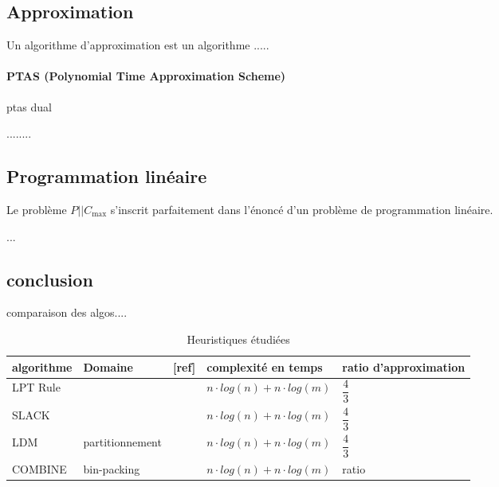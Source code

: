\documentclass[a4paper,12pt]{report}
\theoremstyle{plain}				%
\theoremstyle{definition}				%
\newcommand\problemGrahamP{$P||C_{\max}$\xspace}
\begin{document}
\subsection{Approximation}\label{ssec:Approximation}

Un algorithme d'approximation est un algorithme .....

\paragraph{PTAS (Polynomial Time Approximation Scheme)}
ptas dual 

........

\subsection{Programmation linéaire}\label{ssec:programmationLineaire}

Le problème \problemGrahamP s'inscrit parfaitement dans l'énoncé d'un problème de programmation linéaire.

...

\subsection{conclusion}\label{ssec:etatDeLArtConclusion}

comparaison des algos....

\begin{table}[h] %
\centering
\begin{tabular}{p{3cm} p{3cm} p{1cm} p{4cm} p{4cm}}
\hline
algorithme 	& Domaine 
			& [ref] 
			& complexité en temps 
			& ratio d'approximation\\
\hline

LPT Rule 	&  
			& \cite{graham1966bounds} 
			& $n \cdot log(n) + n \cdot log(m)$ 
			& $\dfrac{4}{3}$ \\

SLACK   	& 
			& \cite{della2020longest} 
			&$n \cdot log(n) + n \cdot log(m)$ 
			& $\dfrac{4}{3}$ \\

LDM   		&  partitionnement 
			& \cite{karmarkar1982differencing} 
			& $n \cdot log(n) + n \cdot log(m)$ 
			& $\dfrac{4}{3}$ \\

COMBINE 	& bin-packing 
			& \cite{lee1988multiprocessor} 
			& $n \cdot log(n) + n \cdot log(m)$ 
			& ratio \\
\hline
\end{tabular}
\caption{Heuristiques étudiées}
\label{table:Heuritiques}
\end{table}
\end{document}
